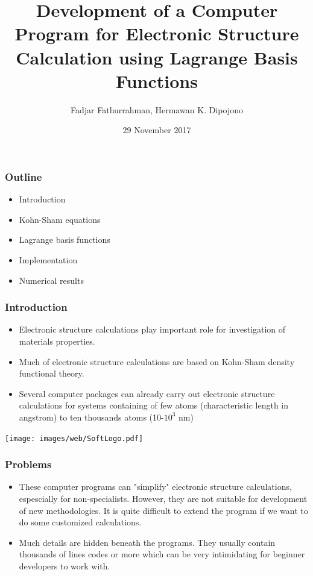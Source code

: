 \documentclass[10pt,t]{beamer}
\begin{document}
\title{Development of a Computer Program for Electronic Structure
Calculation using Lagrange Basis Functions}
\author{Fadjar Fathurrahman, Hermawan K. Dipojono}
\date{29 November 2017}

\frame{\titlepage}

\begin{frame}[c]
\frametitle{Outline}

\begin{itemize}
\item Introduction
\item Kohn-Sham equations
\item Lagrange basis functions
\item Implementation
\item Numerical results
\end{itemize}

\end{frame}

\begin{frame}[c]
\frametitle{Introduction}

\begin{itemize}
\item Electronic structure calculations play important role for investigation of materials
properties.
\item Much of electronic structure calculations are based on Kohn-Sham density functional theory.
\item Several computer packages can already carry out electronic structure calculations
for systems containing of few atoms (characteristic length in angstrom) to ten thousands atoms
(10-$10^3$ nm)
\end{itemize}

{\centering
\texttt{[image: images/web/SoftLogo.pdf]}
\par}

\end{frame}


\begin{frame}[c]
\frametitle{Problems}

\begin{itemize}
\item These computer programs can "simplify" electronic structure calculations,
espescially for non-specialists.
However, they are not suitable for development of new methodologies.
It is quite difficult to extend the program if we want to do some customized calculations.
\item Much details are hidden beneath the programs. They usually contain thousands of lines codes
or more which can be very intimidating for beginner developers to work with.
\end{itemize}

\end{frame}
\end{document}
